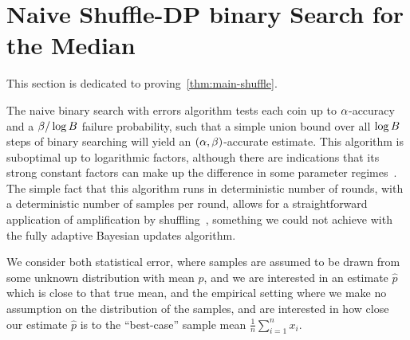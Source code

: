 \section{Naive Shuffle-DP binary Search for the Median}
\label{sec:naive-shuffle}
This section is dedicated to proving~\cref{thm:main-shuffle}.


The naive binary search with errors algorithm tests each coin up to $\alpha$-accuracy and a $\beta/\log B$ failure probability, such that a simple union bound over all $\log B$ steps of binary searching will yield an $(\alpha,\beta)$-accurate estimate. This algorithm is suboptimal up to logarithmic factors, although there are indications that its strong constant factors can make up the difference in some parameter regimes~\cite{karp2007noisy,gretta2023sharp}. The simple fact that this algorithm runs in deterministic number of rounds, with a deterministic number of samples per round, allows for a straightforward application of amplification by shuffling~\cite{feldman21shuffle}, something we could not achieve with the fully adaptive Bayesian updates algorithm. 

We consider both statistical error, where samples are assumed to be drawn from some unknown distribution with mean $p$, and we are interested in an estimate $\hat{p}$ which is close to that true mean, and the empirical setting where we make no assumption on the distribution of the samples, and are interested in how close our estimate $\hat{p}$ is to the ``best-case'' sample mean $\frac{1}{n}\sum_{i=1}^nx_i$.


